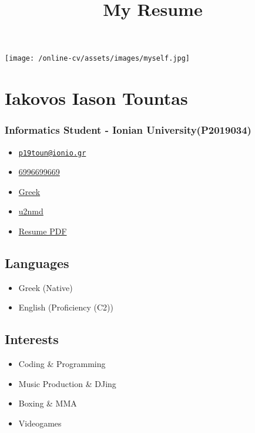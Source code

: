 \documentclass[english,]{article}
\title{My Resume}
\date{}
\providecommand{\tightlist}{%
  \setlength{\itemsep}{0pt}\setlength{\parskip}{0pt}}
\begin{document}
\maketitle

\texttt{[image: /online-cv/assets/images/myself.jpg]}

\hypertarget{iakovos-iason-tountas}{%
\section{Iakovos Iason Tountas}\label{iakovos-iason-tountas}}

\hypertarget{informatics-student---ionian-universityp2019034}{%
\subsubsection{Informatics Student - Ionian
University(P2019034)}\label{informatics-student---ionian-universityp2019034}}

\begin{itemize}
\tightlist
\item
  \emph{} \href{mailto:p19toun@ionio.gr}{\nolinkurl{p19toun@ionio.gr}}
\item
  \emph{} \href{tel:6996699669}{6996699669}
\item
  \emph{} \href{}{Greek}
\item
  \emph{} \href{http://github.com/u2nmd}{u2nmd}
\item
  \emph{}
  \href{https://drive.google.com/file/d/1idT7NbWPX7swRCt8wHx6BkQ78Aivb2F_/view}{Resume
  PDF}
\end{itemize}

\hypertarget{languages}{%
\subsection{Languages}\label{languages}}

\begin{itemize}
\tightlist
\item
  Greek {(Native)}
\item
  English {(Proficiency (C2))}
\end{itemize}

\hypertarget{interests}{%
\subsection{Interests}\label{interests}}

\begin{itemize}
\tightlist
\item
  Coding \& Programming
\item
  Music Production \& DJing
\item
  Boxing \& MMA
\item
  Videogames
\end{itemize}
\end{document}
